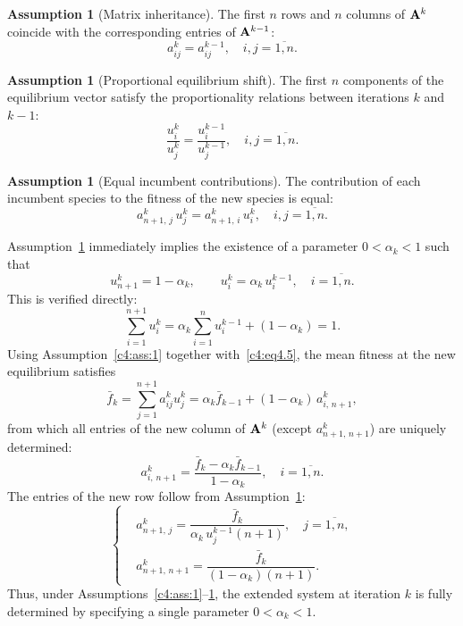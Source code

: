 \documentclass[12pt]{report}
\theoremstyle{definition}
\newtheorem{assumpt}[theorem]{Assumption}
\theoremstyle{remark}
\begin{document}
\begin{assumpt}[Matrix inheritance]\label{c4:ass:2}
The first $n$ rows and $n$ columns of ${\bf A}^k$ coincide with the
corresponding entries of ${\bf A}^{k-1}$:
\begin{equation}
    a_{ij}^k = a_{ij}^{k-1}, \quad i, j = \overline{1,n}.
    \label{c4:eq4.2}
\end{equation}
\end{assumpt}

\begin{assumpt}[Proportional equilibrium shift]\label{c4:ass:3}
The first $n$ components of the equilibrium vector satisfy the proportionality
relations between iterations $k$ and $k-1$:
\begin{equation}
    \frac{u_i^k}{u_j^k} = \frac{u_i^{k-1}}{u_j^{k-1}}, \quad
    i, j = \overline{1,n}.
    \label{c4:eq4.3}
\end{equation}
\end{assumpt}

\begin{assumpt}[Equal incumbent contributions]\label{c4:ass:4}
The contribution of each incumbent species to the fitness of the new species
is equal:
\begin{equation}
    a_{n+1,\,j}^k\, u_j^k = a_{n+1,\,i}^k\, u_i^k, \quad
    i, j = \overline{1,n}.
    \label{c4:eq4.4}
\end{equation}
\end{assumpt}

Assumption~\ref{c4:ass:3} immediately implies the existence of a parameter
$0 < \alpha_k < 1$ such that
\begin{equation}
    u_{n+1}^k = 1 - \alpha_k, \qquad
    u_i^k = \alpha_k\, u_i^{k-1}, \quad i = \overline{1,n}.
    \label{c4:eq4.5}
\end{equation}
This is verified directly:
\[
    \sum_{i=1}^{n+1} u_i^k
    = \alpha_k \sum_{i=1}^{n} u_i^{k-1} + (1 - \alpha_k) = 1.
\]
Using Assumption~\ref{c4:ass:1} together with~\eqref{c4:eq4.5}, the mean fitness at
the new equilibrium satisfies
\[
    \bar{f}_k = \sum_{j=1}^{n+1} a_{ij}^k u_j^k
    = \alpha_k \bar{f}_{k-1} + (1-\alpha_k)\, a_{i,\,n+1}^k,
\]
from which all entries of the new column of ${\bf A}^k$ (except
$a_{n+1,\,n+1}^k$) are uniquely determined:
\begin{equation}
    a_{i,\,n+1}^k = \frac{\bar{f}_k - \alpha_k \bar{f}_{k-1}}{1 - \alpha_k},
    \quad i = \overline{1,n}.
    \label{c4:eq4.6}
\end{equation}
The entries of the new row follow from Assumption~\ref{c4:ass:4}:
\begin{equation}
    \left\{
    \begin{aligned}
        &a_{n+1,\,j}^k = \dfrac{\bar{f}_k}{\alpha_k\, u_j^{k-1}(n+1)},
            \quad j = \overline{1,n}, \\[6pt]
        &a_{n+1,\,n+1}^k = \dfrac{\bar{f}_k}{(1-\alpha_k)(n+1)}.
    \end{aligned}
    \right.
    \label{c4:eq4.7}
\end{equation}
Thus, under Assumptions~\ref{c4:ass:1}--\ref{c4:ass:4}, the extended system at
iteration $k$ is fully determined by specifying a single parameter
$0 < \alpha_k < 1$.
\end{document}
